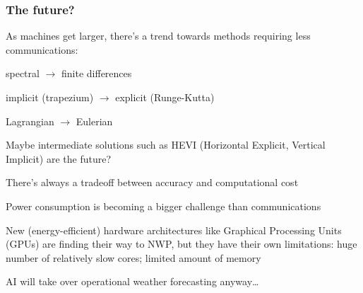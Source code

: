 \documentclass[aspectratio=43,9pt]{beamer}
\begin{document}
\begin{frame}
	\frametitle{The future?}
	\begin{myitemize}{2ex}
		\item As machines get larger, there's a trend towards methods requiring less communications:
			\begin{myitemize}{1ex}
				\item spectral $\rightarrow$ finite differences
				\item implicit (trapezium) $\rightarrow$ explicit (Runge-Kutta)
				\item Lagrangian $\rightarrow$ Eulerian
			\end{myitemize}
		\item Maybe intermediate solutions such as HEVI (Horizontal Explicit, Vertical Implicit) are the future?
		\item There's always a tradeoff between accuracy and computational cost
		\item Power consumption is becoming a bigger challenge than communications
		\item New (energy-efficient) hardware architectures like Graphical Processing Units (GPUs) are finding their way to NWP, but they have their own limitations: huge number of relatively slow cores; limited amount of memory
		\item AI will take over operational weather forecasting anyway\ldots
	\end{myitemize}
\end{frame}
%
%
\end{document}
